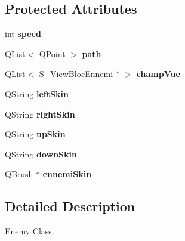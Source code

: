 \subsection*{Protected Attributes}
\begin{DoxyCompactItemize}
\item 
\hypertarget{class_ennemi_abf051ea1d034df4a8b0480e9387f2008}{}int {\bfseries speed}\label{class_ennemi_abf051ea1d034df4a8b0480e9387f2008}

\item 
\hypertarget{class_ennemi_a4ddf1ae5a5662a8206dc6f4a3aac6fbf}{}Q\+List$<$ Q\+Point $>$ {\bfseries path}\label{class_ennemi_a4ddf1ae5a5662a8206dc6f4a3aac6fbf}

\item 
\hypertarget{class_ennemi_aabd4b33e091ce69e811959720e14dde6}{}Q\+List$<$ \hyperlink{class_s___view_bloc_ennemi}{S\+\_\+\+View\+Bloc\+Ennemi} $\ast$ $>$ {\bfseries champ\+Vue}\label{class_ennemi_aabd4b33e091ce69e811959720e14dde6}

\item 
\hypertarget{class_ennemi_a5537ad37a49d572d09a76749238490c2}{}Q\+String {\bfseries left\+Skin}\label{class_ennemi_a5537ad37a49d572d09a76749238490c2}

\item 
\hypertarget{class_ennemi_ab63f4a7fbff796d8c368bd49e254561a}{}Q\+String {\bfseries right\+Skin}\label{class_ennemi_ab63f4a7fbff796d8c368bd49e254561a}

\item 
\hypertarget{class_ennemi_abe2b3007be5ed71b5547a66407b8db3e}{}Q\+String {\bfseries up\+Skin}\label{class_ennemi_abe2b3007be5ed71b5547a66407b8db3e}

\item 
\hypertarget{class_ennemi_a3a72c0537216823ea706923d20f9ed5a}{}Q\+String {\bfseries down\+Skin}\label{class_ennemi_a3a72c0537216823ea706923d20f9ed5a}

\item 
\hypertarget{class_ennemi_afed643ae9412716c1f1caabfdea06fc0}{}Q\+Brush $\ast$ {\bfseries ennemi\+Skin}\label{class_ennemi_afed643ae9412716c1f1caabfdea06fc0}

\end{DoxyCompactItemize}


\subsection{Detailed Description}
Enemy Class. 

